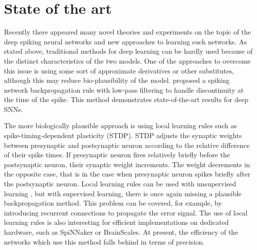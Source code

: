 \section{State of the art}
Recently there appeared many novel theories and experiments on the topic of the deep spiking neural networks and new approaches to learning such networks. As stated above, traditional methods for deep learning can be hardly used because of the distinct characteristics of the two models. One of the approaches to overcome this issue is using some sort of approximate derivatives or other substitutes, although this may reduce bio-plausibility of the model. \cite{leeTrainingDeepSpiking2016} proposed a spiking network backpropagation rule with low-pass filtering to handle discontinuity at the time of the spike. This method demonstrates state-of-the-art results for deep SNNs.\par
The more biologically plausible approach is using local learning rules such as spike-timing-dependent plasticity (STDP). STDP adjusts the synaptic weights between presynaptic and postsynaptic neuron according to the relative difference of their spike times. If presynaptic neuron fires relatively briefly before the postsynaptic neuron, their synaptic weight increments. The weight decrements in the opposite case, that is in the case when presynaptic neuron spikes briefly after the postsynaptic neuron. Local learning rules can be used with unsupervised learning \cite{tavanaeiDeepLearningSpiking2019}, but with supervised learning, there is once again missing a plausible backpropagation method. This problem can be covered, for example, by introducing recurrent connections to propagate the error signal. The use of local learning rules is also interesting for efficient implementations on dedicated hardware, such as SpiNNaker\cite{furberSpiNNakerProject14} or BrainScales. At present, the efficiency of the networks which use this method falls behind in terms of precision. \par
